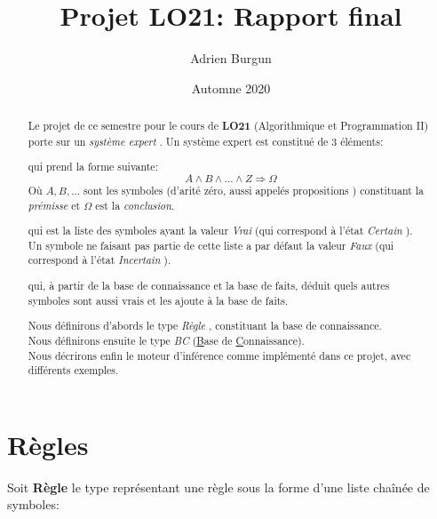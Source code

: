 \documentclass[12pt]{article}
\title{Projet LO21: Rapport final}
\author{Adrien Burgun}
\date{Automne 2020}
\begin{document}
\maketitle

\begin{abstract}

  Le projet de ce semestre pour le cours de \textbf{LO21} (Algorithmique et Programmation II) porte sur un \textit{\og système expert \fg}.
  Un système expert est constitué de 3 éléments:

  \begin{description}[align=left]
    \item [Une base de connaissance,] qui prend la forme suivante:
    \[
      A \wedge B \wedge ... \wedge Z \Rightarrow \Omega
    \]
    Où \(A, B, ...\) sont les symboles (d'arité zéro, aussi appelés \og propositions \fg) constituant la \textit{prémisse} et \(\Omega\) est la \textit{conclusion}.

    \item [Une base de faits,] qui est la liste des symboles ayant la valeur \textit{\og Vrai \fg} (qui correspond à l'état \textit{\og Certain \fg}). \\
    Un symbole ne faisant pas partie de cette liste a par défaut la valeur \textit{\og Faux \fg} (qui correspond à l'état \textit{\og Incertain \fg}).

    \item [Un moteur d'inférence,] qui, à partir de la base de connaissance et la base de faits, déduit quels autres symboles sont aussi vrais et les ajoute à la base de faits.
  \end{description}

  Nous définirons d'abords le type \textit{\og Règle \fg}, constituant la base de connaissance. \\
  Nous définirons ensuite le type \textit{\og BC \fg} (\underline{B}ase de \underline{C}onnaissance). \\
  Nous décrirons enfin le moteur d'inférence comme implémenté dans ce projet, avec différents exemples.
\end{abstract}

\newpage

\section{Règles}

Soit \textbf{Règle} le type représentant une règle sous la forme d'une liste chaînée de symboles:
\end{document}
